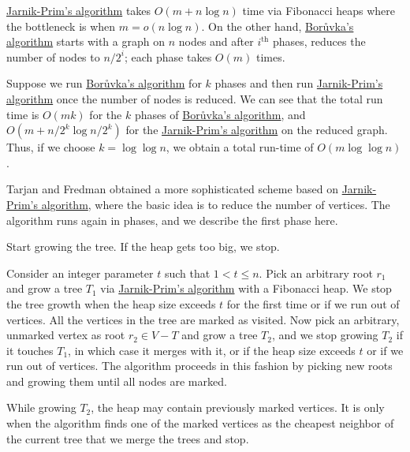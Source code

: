 \begin{prev}
	\hyperref[algo:Jarnik-Prim]{Jarnik-Prim's algorithm} takes \(O(m + n \log n)\) time via Fibonacci heaps where the bottleneck is when \(m = o(n \log n)\). On the other hand, \hyperref[algo:Boruvka]{Borůvka's algorithm} starts with a graph on \(n\) nodes and after \(i^{\text{th} }\) phases, reduces the number of nodes to \(n / 2^i\); each phase takes \(O(m)\) times.
\end{prev}

\begin{intuition}
	Suppose we run \hyperref[algo:Boruvka]{Borůvka's algorithm} for \(k\) phases and then run \hyperref[algo:Jarnik-Prim]{Jarnik-Prim's algorithm} once the number of nodes is reduced. We can see that the total run time is \(O(m k)\) for the \(k\) phases of \hyperref[algo:Boruvka]{Borůvka's algorithm}, and \(O(m + n / 2^k \log n / 2^k)\) for the \hyperref[algo:Jarnik-Prim]{Jarnik-Prim's algorithm} on the reduced graph. Thus, if we choose \(k = \log \log n\), we obtain a total run-time of \(O(m \log \log n)\).
\end{intuition}

Tarjan and Fredman obtained a more sophisticated scheme based on \hyperref[algo:Jarnik-Prim]{Jarnik-Prim's algorithm}, where the basic idea is to reduce the number of vertices. The algorithm runs again in phases, and we describe the first phase here.

\begin{intuition}
	Start growing the tree. If the heap gets too big, we stop.
\end{intuition}

Consider an integer  parameter \(t\) such that \(1 < t \leq n\). Pick an arbitrary root \(r_1\) and grow a tree \(T_1\) via \hyperref[algo:Jarnik-Prim]{Jarnik-Prim's algorithm} with a Fibonacci heap. We stop the tree growth when the heap size exceeds \(t\) for the first time or if we run out of vertices. All the vertices in the tree are marked as visited. Now pick an arbitrary, unmarked vertex as root \(r_2 \in V - T\) and grow a tree \(T_2\), and we stop growing \(T_2\) if it touches \(T_1\), in which case it merges with it, or if the heap size exceeds \(t\) or if we run out of vertices. The algorithm proceeds in this fashion by picking new roots and growing them until all nodes are marked.

\begin{note}
	While growing \(T_2\), the heap may contain previously marked vertices. It is only when the algorithm finds one of the marked vertices as the cheapest neighbor of the current tree that we merge the trees and stop.
\end{note}

